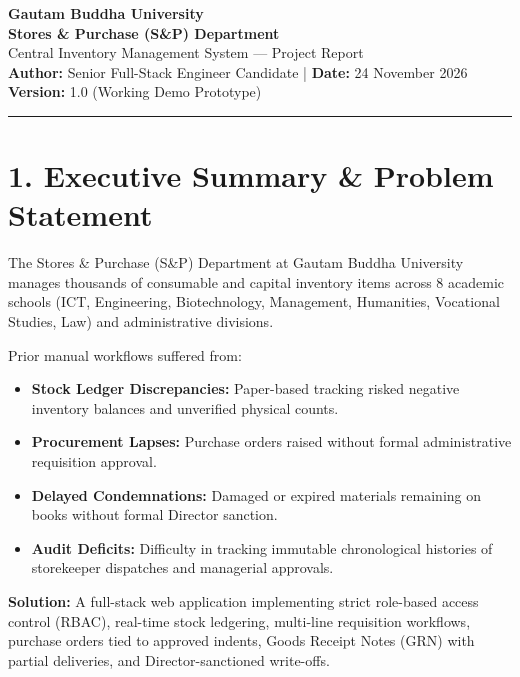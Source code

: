 \documentclass[11pt,a4paper]{article}
\begin{document}
\begin{center}
    {\Huge\bfseries Gautam Buddha University}\\[0.3em]
    {\Large\bfseries Stores \& Purchase (S\&P) Department}\\[0.2em]
    {\large Central Inventory Management System --- Project Report}\\[0.5em]
    \textbf{Author:} Senior Full-Stack Engineer Candidate \quad | \quad \textbf{Date:} 24 November 2026\\[0.2em]
    \textbf{Version:} 1.0 (Working Demo Prototype)
\end{center}
\vspace{1em}
\hrule
\vspace{1.5em}

\section{1. Executive Summary \& Problem Statement}
The Stores \& Purchase (S\&P) Department at Gautam Buddha University manages thousands of consumable and capital inventory items across 8 academic schools (ICT, Engineering, Biotechnology, Management, Humanities, Vocational Studies, Law) and administrative divisions. 

Prior manual workflows suffered from:
\begin{itemize}[noitemsep]
    \item \textbf{Stock Ledger Discrepancies:} Paper-based tracking risked negative inventory balances and unverified physical counts.
    \item \textbf{Procurement Lapses:} Purchase orders raised without formal administrative requisition approval.
    \item \textbf{Delayed Condemnations:} Damaged or expired materials remaining on books without formal Director sanction.
    \item \textbf{Audit Deficits:} Difficulty in tracking immutable chronological histories of storekeeper dispatches and managerial approvals.
\end{itemize}

\textbf{Solution:} A full-stack web application implementing strict role-based access control (RBAC), real-time stock ledgering, multi-line requisition workflows, purchase orders tied to approved indents, Goods Receipt Notes (GRN) with partial deliveries, and Director-sanctioned write-offs.
\end{document}
